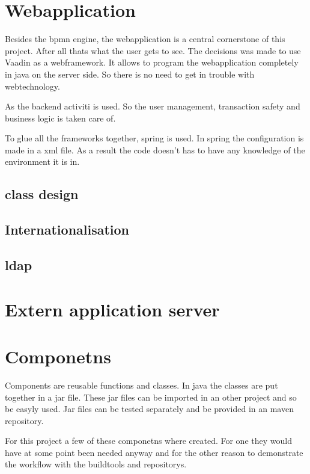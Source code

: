 \documentclass[paper=a4,twoside=false,BCOR=0mm,DIV=calc,fontsize=12pt]{scrartcl}
\begin{document}
\section{Webapplication}
Besides the bpmn engine, the webapplication is a central cornerstone of this project. After all thats what the user gets to see.
The decisions was made to use Vaadin as a webframework. It allows to program the webapplication completely in java on the server side. So there is no need to get in trouble with webtechnology.

As the backend activiti is used. So the user management, transaction safety and business logic is taken care of.

To glue all the frameworks together, spring is used. In spring the configuration is made in a xml file. As a result the code doesn't has to have any knowledge of the environment it is in.


\subsection{class design}






\subsection{Internationalisation}




\subsection{ldap}


\section{Extern application server}





\section{Componetns}
Components are reusable functions and classes. In java the classes are put together in a jar file. These jar files can be imported in an other 
project and so be easyly used.
Jar files can be tested separately and be provided in an maven repository.

For this project a few of these componetns where created. For one they would have at some point been needed anyway and for the other reason to 
demonstrate the workflow with the buildtools and repositorys.
\end{document}
